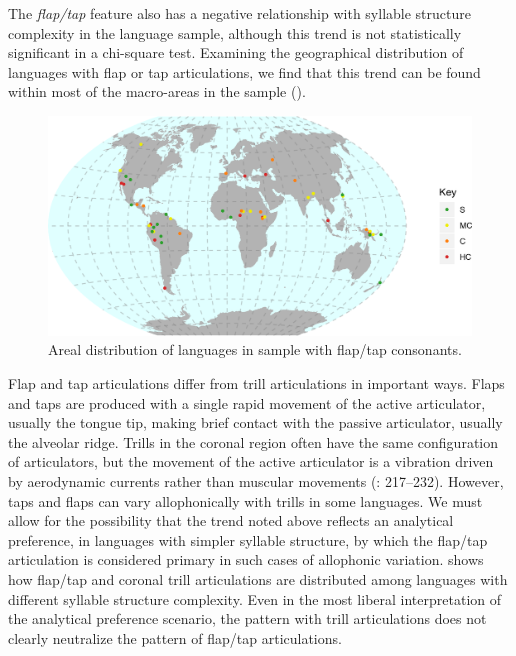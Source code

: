   The \textit{flap/tap} feature also has a negative relationship with syllable structure complexity in the language sample, although this trend is not statistically significant in a chi-square test. Examining the geographical distribution of languages with flap or tap articulations, we find that this trend can be found within most of the macro-areas in the sample ().


\begin{figure}  
\includegraphics[width=\textwidth]{figures/fig416.png}
\caption{\label{fig:4.16}Areal distribution of languages in sample with flap/tap consonants.}
\end{figure}

  Flap and tap articulations differ from trill articulations in important ways. Flaps and taps are produced with a single rapid movement of the active articulator, usually the tongue tip, making brief contact with the passive articulator, usually the alveolar ridge. Trills in the coronal region often have the same configuration of articulators, but the movement of the active articulator is a vibration driven by aerodynamic currents rather than muscular movements (\citealt{LadefogedMaddieson1996}: 217--232). However, taps and flaps can vary allophonically with trills in some languages. We must allow for the possibility that the trend noted above reflects an analytical preference, in languages with simpler syllable structure, by which the flap/tap articulation is considered primary in such cases of allophonic variation.  shows how flap/tap and coronal trill articulations are distributed among languages with different syllable structure complexity. Even in the most liberal interpretation of the analytical preference scenario, the pattern with trill articulations does not clearly neutralize the pattern of flap/tap articulations.

